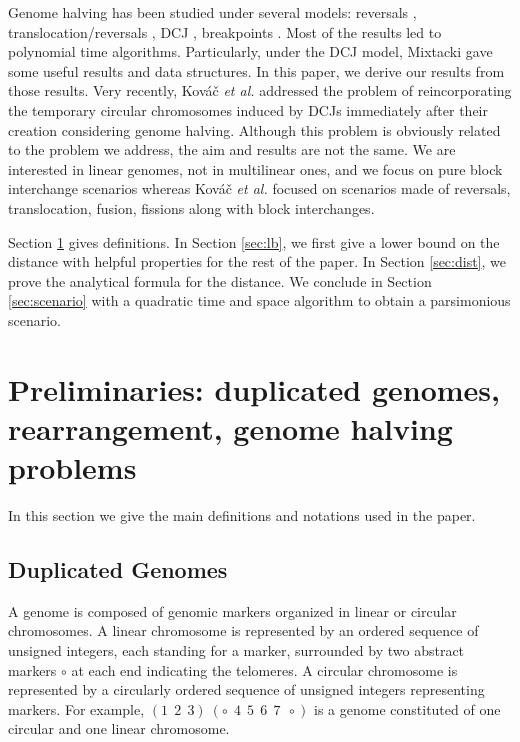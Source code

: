\documentclass{llncs}
\newcommand{\fst}[1]{ \ensuremath{#1} }
\def\etal{\textsl{et al.}\xspace}
\begin{document}
Genome halving has been studied under several models: reversals
\cite{Mabrouk98}, translocation/reversals \cite{Mabrouk03}, DCJ
\cite{Warren08}, breakpoints \cite{Tannier08}. Most of the results led
to polynomial time algorithms. Particularly, under the DCJ model,
Mixtacki \cite{Mixtacki08} gave some useful results and data structures. 
In this paper, we derive our results from those
results. Very recently, Kov{\'a}{\v c} \etal \cite{Kovac10} addressed 
the problem of
reincorporating the temporary circular chromosomes induced by DCJs
immediately after their creation considering genome halving. 
Although this problem is obviously related to the
problem we address, the aim and results are not the same. We are interested 
in linear genomes, not in multilinear ones,
and we focus on pure block interchange scenarios whereas Kov{\'a}{\v c}
\etal focused on scenarios made of reversals, translocation, fusion,
fissions along with block interchanges.

Section \ref{sec:pre} gives definitions. In Section \ref{sec:lb}, we
first give a lower bound on the distance with helpful properties for
the rest of the paper. In Section \ref{sec:dist}, we prove the
analytical formula for the distance. We conclude in Section
\ref{sec:scenario} with a quadratic time and space algorithm to
obtain a parsimonious scenario.


\section{Preliminaries: duplicated genomes, rearrangement, genome halving problems}
\label{sec:pre}

In this section we give the main definitions and notations used in the paper.

\subsection*{Duplicated Genomes}

A genome is composed of genomic markers organized in linear or circular 
chromosomes. A linear chromosome is represented by an ordered sequence of 
unsigned integers, each standing for a marker, surrounded by two abstract 
markers $\circ$  at each end indicating the telomeres. A circular chromosome 
is represented by a circularly ordered sequence of unsigned integers 
representing markers. For example,  
$(\fst{1}~~\fst{2}~~\fst{3}) ~
(\circ~~\fst{4}~~\fst{5}~~\fst{6}~~\fst{7}~~\circ)$ is a genome
constituted of one circular and one linear chromosome. 
\end{document}
